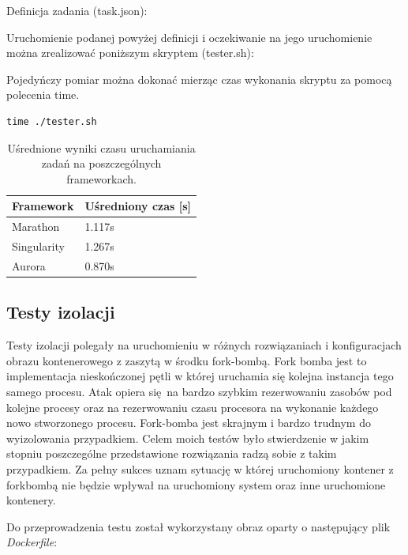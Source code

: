\documentclass[10pt,a4paper,titlepage,twoside]{report}
\begin{document}
Definicja zadania (task.json):


Uruchomienie podanej powyżej definicji i oczekiwanie na jego uruchomienie można zrealizować poniższym skryptem (tester.sh):


Pojedyńczy pomiar można dokonać mierząc czas wykonania skryptu za pomocą polecenia time.
\begin{lstlisting}
time ./tester.sh
\end{lstlisting}

\begin{table}[!h]
\caption{Uśrednione wyniki czasu uruchamiania zadań na poszczególnych frameworkach.}
\label{framework_results}
\centering
\begin{tabular}{|p{4cm}|p{4cm}|}
  \hline
  \textbf{Framework} & \textbf{Uśredniony czas [s]} \\
  \hline
  Marathon & 1.117s \\
  \hline
  Singularity & 1.267s \\
  \hline
  Aurora & 0.870s \\
  \hline
\end{tabular}
\end{table}

\subsection{Testy izolacji}
Testy izolacji polegały na uruchomieniu w różnych rozwiązaniach i konfiguracjach obrazu kontenerowego z zaszytą w środku fork-bombą. Fork bomba jest to implementacja nieskończonej pętli w której uruchamia się kolejna instancja tego samego procesu. Atak opiera się na bardzo szybkim rezerwowaniu zasobów pod kolejne procesy oraz na rezerwowaniu czasu procesora na wykonanie każdego nowo stworzonego procesu. Fork-bomba jest skrajnym i bardzo trudnym do wyizolowania przypadkiem. Celem moich testów było stwierdzenie w jakim stopniu poszczególne przedstawione rozwiązania radzą sobie z takim przypadkiem. Za pełny sukces uznam sytuację w której uruchomiony kontener z forkbombą nie będzie wpływał na uruchomiony system oraz inne uruchomione kontenery.

Do przeprowadzenia testu został wykorzystany obraz oparty o następujący plik \textit{Dockerfile}:

\end{document}
